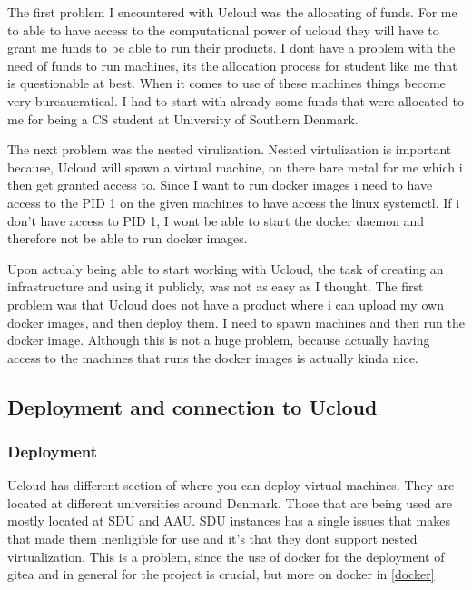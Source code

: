 The first problem I encountered with Ucloud\cite{ucloud} was the allocating of funds. For me to able to have access to the 
computational power of ucloud they will have to grant me funds to be able to run their products. I dont have a problem with 
the need of funds to run machines, its the allocation process for student like me that is questionable at best.
When it comes to use of these machines things become very bureaucratical.
I had to start with already some funds that were allocated to me for being a \ac{CS} student at University of Southern Denmark.


The next problem was the nested virulization. Nested virtulization is important because, Ucloud will spawn 
a virtual machine, on there bare metal for me which i then get granted access to. Since I want to run docker images
i need to have access to the PID 1 on the given machines to have access the linux systemctl. If i don't
have access to PID 1, I wont be able to start the docker daemon and therefore not be able to run docker images.

Upon actualy being able to start working with Ucloud, the task of creating an infrastructure and using it publicly, was not as easy as I thought.
The first problem was that Ucloud does not have a product where i can upload my own docker images, and then deploy them.
I need to spawn machines and then run the docker image. Although this is not a huge problem, because actually 
having access to the machines that runs the docker images is actually kinda nice.

\subsection{Deployment and connection to Ucloud}
\label{subsec:deployment-and-connetion-ucloud}
\subsubsection{Deployment}
\label{subsubsec:deployment-ucloud}

Ucloud has different section of where you can deploy virtual machines. They are located at different universities around Denmark.
Those that are being used are mostly located at SDU and AAU. SDU instances has a single issues that makes that made them inenligible for
use and it's that they dont support nested virtualization. This is a problem, since the use of docker for the deployment of 
gitea and in general for the project is crucial, but more on docker in \ref{docker}

